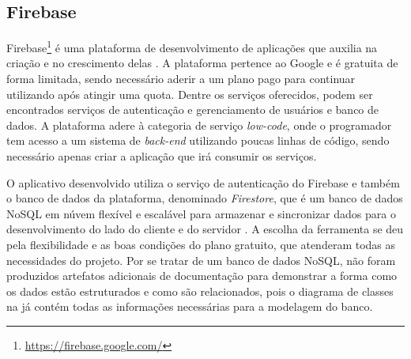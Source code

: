 \subsection{Firebase}
\label{firebase}

Firebase\footnote{\url{https://firebase.google.com/}} é uma plataforma de desenvolvimento de aplicações que auxilia na criação e no crescimento delas \cite{firebase}. A plataforma pertence ao Google e é gratuita de forma limitada, sendo necessário aderir a um plano pago para continuar utilizando após atingir uma quota. Dentre os serviços oferecidos, podem ser encontrados serviços de autenticação e gerenciamento de usuários e banco de dados. A plataforma adere à categoria de serviço \textit{low-code}, onde o programador tem acesso a um sistema de \textit{back-end} utilizando poucas linhas de código, sendo necessário apenas criar a aplicação que irá consumir os serviços.

O aplicativo desenvolvido utiliza o serviço de autenticação do Firebase e também o banco de dados da plataforma, denominado \textit{Firestore}, que é um banco de dados NoSQL em núvem flexível e escalável para armazenar e sincronizar dados para o desenvolvimento do lado do cliente e do servidor \cite{firestore}. A escolha da ferramenta se deu pela flexibilidade e as boas condições do plano gratuito, que atenderam todas as necessidades do projeto. Por se tratar de um banco de dados NoSQL, não foram produzidos artefatos adicionais de documentação para demonstrar a forma como os dados estão estruturados e como são relacionados, pois o diagrama de classes na  já contém todas as informações necessárias para a modelagem do banco.
